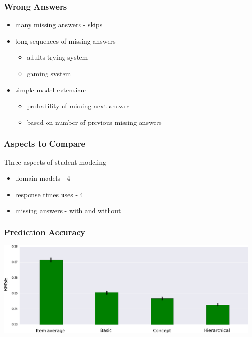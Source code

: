 \documentclass[xcolor=svgnames]{beamer}
\begin{document}
\begin{frame}
    \frametitle{Wrong Answers}

    \begin{itemize}
        \item many missing answers - skips
        \item long sequences of missing answers
        \begin{itemize}
            \item adults trying system
            \item gaming system
        \end{itemize}
        \item simple model extension:
        \begin{itemize}
            \item probability of missing next answer
            \item based on number of previous missing answers
        \end{itemize}
    \end{itemize}
\end{frame}
\begin{frame}
    \frametitle{Aspects to Compare}

    Three aspects of student modeling
    \begin{itemize}
        \item domain models - 4
        \item response times uses - 4
        \item missing answers - with and without
    \end{itemize}

\end{frame}
\begin{frame}
    \frametitle{Prediction Accuracy}

    \includegraphics[width=\linewidth]{figures/missing-answers-0}
\end{frame}
\end{document}
